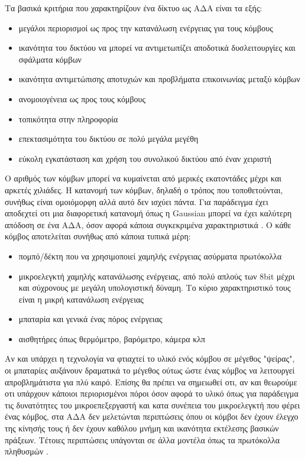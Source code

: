 Τα βασικά κριτήρια που χαρακτηρίζουν ένα δίκτυο ως ΑΔΑ είναι τα εξής:
\begin{itemize}
\item μεγάλοι περιορισμοί ως προς την κατανάλωση ενέργειας για τους κόμβους
\item ικανότητα του δικτύου να μπορεί να αντιμετωπίζει αποδοτικά δυσλειτουργίες και σφάλματα κόμβων
\item ικανότητα αντιμετώπισης αποτυχιών και προβλήματα επικοινωνίας μεταξύ κόμβων
\item ανομοιογένεια ως προς τους κόμβους
\item τοπικότητα στην πληροφορία
\item επεκτασιμότητα του δικτύου σε πολύ μεγάλα μεγέθη
\item εύκολη εγκατάσταση και χρήση του συνολικού δικτύου από έναν χειριστή
\end{itemize}
Ο αριθμός των κόμβων μπορεί να κυμαίνεται από μερικές εκατοντάδες μέχρι και αρκετές χιλιάδες.
Η κατανομή των κόμβων, δηλαδή ο τρόπος που τοποθετούνται, συνήθως είναι ομοιόμορφη αλλά αυτό δεν ισχύει πάντα. Για παράδειγμα έχει αποδεχτεί οτι μια διαφορετική
κατανομή όπως η Gaussian μπορεί να έχει καλύτερη απόδοση σε ένα ΑΔΑ, όσον αφορά κάποια συγκεκριμένα χαρακτηριστικά \cite{gaussian_sensors}.
Ο κάθε κόμβος αποτελείται συνήθως από κάποια τυπικά μέρη:
\begin{itemize}
\item πομπό/δέκτη που να χρησιμοποιεί χαμηλής ενέργειας ασύρματα πρωτόκολλα
\item μικροελεγκτή χαμηλής κατανάλωσης ενέργειας, από πολύ απλούς των 8bit μέχρι και σύχρονους με μεγάλη υπολογιστική δύναμη. Το κύριο χαρακτηριστικό τους είναι η
μικρή κατανάλωση ενέργειας
\item μπαταρία και γενικά ένας πόρος ενέργειας
\item αισθητήρες όπως θερμόμετρο, βαρόμετρο, κάμερα κλπ
\end{itemize}
Αν και υπάρχει η τεχνολογία να φτιαχτεί το υλικό ενός κόμβου σε μέγεθος "ψείρας", οι μπαταρίες αυξάνουν δραματικά το μέγεθος ούτως ώστε ένας κόμβος να λειτουργεί
απροβλημάτιστα για πλύ καιρό.
Επίσης θα πρέπει να σημειωθεί οτι, αν και θεωρούμε οτι υπάρχουν κάποιοι περιορισμένοι πόροι όσον αφορά το υλικό όπως για παράδειγμα τις δυνατότητες
του μικροεπεξεργαστή και κατα συνέπεια του μικροελεγκτή που φέρει ένας κόμβος, στα ΑΔΑ δεν μελετώνται περιπτώσεις όπου οι κόμβοι δεν έχουν έλεγχο της κίνησής τους ή
δεν έχουν καθόλου μνήμη και ικανότητα εκτέλεσης βασικών πράξεων.
Τέτοιες περιπτώσεις υπάγονται σε άλλα μοντέλα όπως τα πρωτόκολλα πληθυσμών \cite{population_protocols}.


